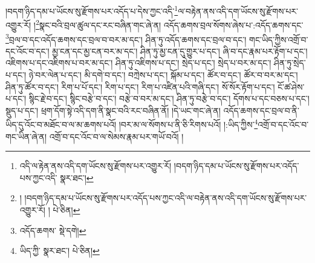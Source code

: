 །བདག་ཉིད་དམ་པ་ཡོངས་སུ་རྫོགས་པར་འདོད་པ་དེས་ཀྱང་འདི་\footnote{འདི་ལ་རྟེན་ནས་འདི་དག་ཡོངས་སུ་རྫོགས་པར་འགྱུར་རོ། །བདག་ཉིད་དམ་པ་ཡོངས་སུ་རྫོགས་པར་འདོད་པས་ཀྱང་འདི་  སྣར་ཐང་། }ལ་བརྟེན་ནས་འདི་དག་ཡོངས་སུ་རྫོགས་པར་འགྱུར་རོ། །\footnote{། །བདག་ཉིད་དམ་པ་ཡོངས་སུ་རྫོགས་པར་འདོད་པས་ཀྱང་འདི་ལ་བརྟེན་ནས་འདི་དག་ཡོངས་སུ་རྫོགས་པར་འགྱུར་རོ། །  པེ་ཅིན། }སྣང་བའི་བྲལ་ཚུལ་དང་རང་བཞིན་གང་ཞེ་ན། འདོད་ཆགས་བྲལ་སོགས་ཞེས་པ་:འདོད་ཆགས་དང་\footnote{འདོད་ཆགས་  སྡེ་དགེ། }བྲལ་བ་དང་འདོད་ཆགས་དང་བྲལ་བ་བར་མ་དང་། ཤིན་ཏུ་འདོད་ཆགས་དང་བྲལ་བ་དང་། གང་ཡིད་ཀྱིས་འགྲོ་བ་དང་འོང་བ་དང་། མྱ་ངན་དང་མྱ་ངན་བར་མ་དང་། ཤིན་ཏུ་མྱ་ངན་དུ་གྱུར་པ་དང་། ཞི་བ་དང་རྣམ་པར་རྟོག་པ་དང་། འཇིགས་པ་དང་འཇིགས་པ་བར་མ་དང་། ཤིན་ཏུ་འཇིགས་པ་དང་། སྲེད་པ་དང་། སྲེད་པ་བར་མ་དང་། ཤིན་ཏུ་སྲེད་པ་དང་། ཉེ་བར་ལེན་པ་དང་། མི་དགེ་བ་དང་། བཀྲེས་པ་དང་། སྐོམ་པ་དང་། ཚོར་བ་དང་། ཚོར་བ་བར་མ་དང་། ཤིན་ཏུ་ཚོར་བ་དང་། རིག་པ་པོ་དང་། རིག་པ་དང་། རིག་པ་འཛིན་པའི་གཞི་དང་། སོ་སོར་རྟོག་པ་དང་། ངོ་ཚ་ཤེས་པ་དང་། སྙིང་རྗེ་བ་དང་། སྙིང་བརྩེ་བ་དང་། བརྩེ་བ་བར་མ་དང་། ཤིན་ཏུ་བརྩེ་བ་དང་། དོགས་པ་དང་བཅས་པ་དང་། སྡུད་པ་དང་། ཕྲག་དོག་སྟེ་འདི་དག་ནི་སྣང་བའི་རང་བཞིན་ནོ། །དེ་ཡང་གང་ཞེ་ན། འདོད་ཆགས་དང་བྲལ་བ་ནི་ཡིད་དུ་འོང་བ་མཐོང་བ་ལ་མ་ཆགས་པའོ། །བར་མ་ལ་སོགས་པ་ནི་ཅི་རིགས་པའོ། །:ཡིད་ཀྱིས་\footnote{ཡིད་ཀྱི་  སྣར་ཐང་།  པེ་ཅིན། }འགྲོ་བ་དང་འོང་བ་གང་ཡིན་ཞེ་ན། འགྲོ་བ་དང་འོང་བ་ལ་སེམས་རྣམ་པར་གཡོ་བའོ། །
